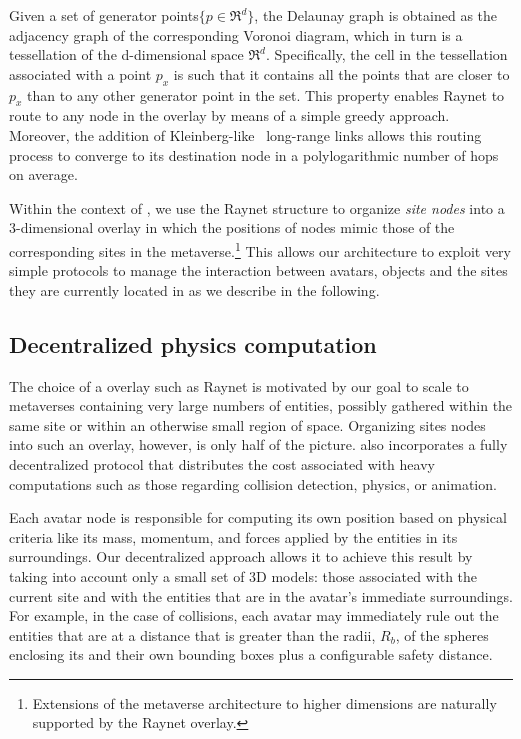 Given a set of generator points$\{p \in \Re^d\}$, the Delaunay graph
is obtained as the adjacency graph of the corresponding Voronoi
diagram, which in turn is a tessellation of the d-dimensional space
$\Re^d$. Specifically, the cell in the tessellation associated with a
point $p_x$ is such that it contains all the points that are closer to
$p_x$ than to any other generator point in the set. This property
enables Raynet to route to any node in the overlay by means of a
simple greedy approach. Moreover, the addition of
Kleinberg-like~\cite{ jk:smallworld} long-range links allows this
routing process to converge to its destination node in a
polylogarithmic number of hops on average.

Within the context of \sol, we use the Raynet structure to organize
\emph{site nodes} into a 3-dimensional overlay in which the positions
of nodes mimic those of the corresponding sites in the
metaverse.\footnote{Extensions of the metaverse architecture to higher
  dimensions are naturally supported by the Raynet overlay.} This
allows our architecture to exploit very simple protocols to manage the
interaction between avatars, objects and the sites they are currently
located in as we describe in the following.

\subsection{Decentralized physics computation}
\label{sec:decentr-phys-comp}
The choice of a \ptp overlay such as Raynet is motivated by our goal
to scale to metaverses containing very large numbers of entities,
possibly gathered within the same site or within an otherwise
small region of space. Organizing sites nodes into such an overlay,
however, is only half of the picture. \sol also incorporates a fully
decentralized protocol that distributes the cost associated with heavy
computations such as those regarding collision detection, physics, or
animation.


Each avatar node is responsible for computing its own position based
on physical criteria like its mass, momentum, and forces applied
by the entities in its surroundings. Our decentralized approach allows
it to achieve this result by taking into account only a small set of
3D models: those associated with the current site and with the
entities that are in the avatar's immediate surroundings. 
For example, in the case of collisions, each avatar may immediately
rule out the entities that are at a distance that is greater than the
radii, $R_b$, of the spheres enclosing its and their own bounding boxes
plus a configurable safety distance.

